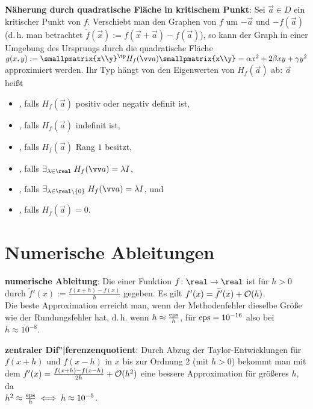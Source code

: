 \textbf{Näherung durch quadratische Fläche in kritischem Punkt}:
Sei $\vec{a} \in D$ ein kritischer Punkt von $f$.
Verschiebt man den Graphen von $f$ um $-\vec{a}$ und $-f(\vec{a})$
(d.\,h. man betrachtet $\widetilde{f}(\vec{x}) := f(\vec{x} + \vec{a}) - f(\vec{a})$),
so kann der Graph in einer Umgebung des Ursprungs durch die quadratische Fläche
$g(x, y) := \smallpmatrix{x\\y}^\tp H_f(\vec{a}) \smallpmatrix{x\\y}
= \alpha x^2 + 2\beta xy + \gamma y^2$
approximiert werden.
Ihr Typ hängt von den Eigenwerten von $H_f(\vec{a})$ ab:
$\vec{a}$ heißt
\begin{itemize}
    \item
    , falls $H_f(\vec{a})$ positiv oder negativ definit ist,

    \item
    , falls $H_f(\vec{a})$ indefinit ist,

    \item
    , falls $H_f(\vec{a})$ Rang $1$ besitzt,

    \item
    , falls $\exists_{\lambda \in \real}\; H_f(\vec{a}) = \lambda I$,

    \item
    , falls
    $\exists_{\lambda \in \real \setminus \{0\}}\; H_f(\vec{a}) = \lambda I$, und

    \item
    , falls $H_f(\vec{a}) = 0$.
\end{itemize}

\section{%
    Numerische Ableitungen%
}

\textbf{numerische Ableitung}:
Die  einer Funktion $f\colon \real \to \real$ ist für $h > 0$ durch
$\widetilde{f}'(x) := \frac{f(x + h) - f(x)}{h}$ gegeben.
Es gilt $f'(x) = \widetilde{f}'(x) + \mathcal{O}(h)$.\\
Die beste Approximation erreicht man, wenn der Methodenfehler dieselbe Größe wie der Rundungsfehler
hat, d.\,h. wenn $h \approx \frac{\mathrm{eps}}{h}$, für $\mathrm{eps} = 10^{-16}$ also bei $h \approx 10^{-8}$.

\textbf{zentraler Dif"|ferenzenquotient}:
Durch Abzug der Taylor-Entwicklungen für $f(x + h)$ und $f(x - h)$ in $x$
bis zur Ordnung $2$ (mit $h > 0$) bekommt man mit dem 
$f'(x) = \frac{f(x + h) - f(x - h)}{2h} + \mathcal{O}(h^2)$
eine bessere Approximation für größeres $h$,
da\\ $h^2 \approx \frac{\mathrm{eps}}{h} \iff h \approx 10^{-5}$.

